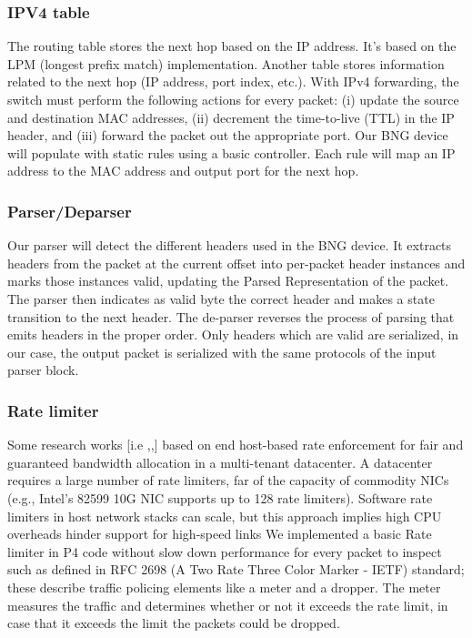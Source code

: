 \subsubsection{IPV4 table}
The routing table stores the next hop based on the IP address. It’s based on the LPM (longest prefix match) implementation. Another table stores information related to the next hop (IP address, port index, etc.).
With IPv4 forwarding, the switch must perform the following actions for every packet: (i) update the source and destination MAC addresses, (ii) decrement the time-to-live (TTL) in the IP header, and (iii) forward the packet out the appropriate port.
Our BNG device will populate with static rules using a basic controller.  Each rule will map an IP address to the MAC address and output port for the next hop.

\subsubsection{Parser/Deparser}
Our parser will detect the different headers used in the BNG device. It extracts headers from the packet at the current offset into per-packet header instances and marks those instances valid, updating the Parsed Representation of the packet. The parser then indicates as valid byte the correct header and makes a state transition to the next header.
The de-parser reverses the process of parsing that emits headers in the proper order. Only headers which are valid are serialized, in our case, the output packet is serialized with the same protocols of the input parser block.

\subsubsection{Rate limiter}
Some research works [i.e \cite{Rodrigues},\cite{Popa},\cite{Ballani}]  based on end host-based rate enforcement for fair and guaranteed bandwidth allocation  in a  multi-tenant datacenter. 
A datacenter requires a large number of rate limiters, far of the capacity of commodity NICs (e.g., Intel’s 82599 10G NIC supports up to 128 rate limiters). Software rate limiters in host network stacks can scale, but this approach implies high CPU overheads hinder support for high-speed links \cite{Radhakrishnan_2014}
We implemented a basic Rate limiter in P4 code without slow down performance for every packet to inspect such as defined in RFC 2698 (A Two Rate Three Color Marker - IETF) standard; these describe traffic policing elements like a meter and a dropper.  The meter measures the traffic and determines whether or not it exceeds the rate limit, in case that it exceeds the limit the packets could be dropped.


